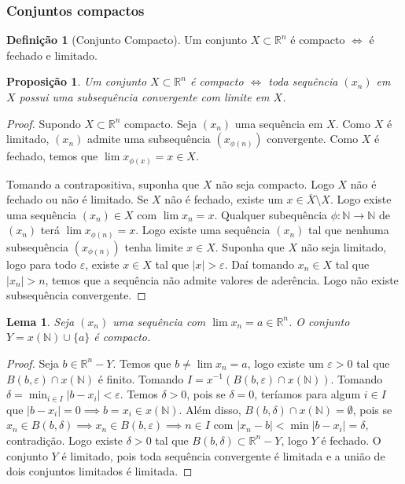 \documentclass{article}
\newtheorem{prop}{Proposição}[section]
\theoremstyle{theorem}
\theoremstyle{lemma}
\newtheorem{lema}{Lema}
\theoremstyle{definition}
\newtheorem{definicao}{Definição}[section]
\theoremstyle{remark}
\begin{document}
   \subsubsection{ Conjuntos compactos}
\begin{definicao}[Conjunto Compacto]
	Um conjunto $X\subset \mathbb{R}^n$ é compacto $\iff $ é fechado e limitado.
\end{definicao}
\begin{prop}
	Um conjunto $X\subset \mathbb{R}^n$ é compacto $\iff$ toda sequência $(x_n)$  em $X$ possui uma subsequência convergente com limite em $X$.
\end{prop}
\begin{proof}
	Supondo $X\subset\mathbb{R}^n$ compacto. Seja $(x_n)$ uma sequência em $X$. Como $X$ é limitado, $(x_n)$ admite uma subsequência $(x_{\phi(n)})$ convergente. Como $X$ é fechado, temos que $\lim x_{\phi(x)}= x\in X$.

	Tomando a contrapositiva, suponha que $X$ não seja compacto. Logo $X$ não é fechado ou não é limitado. Se $X$ não é fechado, existe um $x\in \overline{X} \setminus X$. Logo existe uma sequência $(x_n)\in X$ com $\lim x_n = x$. Qualquer subequência $\phi:\mathbb{N}\to \mathbb{N}$  de $(x_n)$ terá $\lim x_{\phi(n)} = x$. Logo existe uma sequência $(x_n)$ tal que nenhuma subsequência $(x_{\phi(n)})$ tenha limite $x\in X$.
	Suponha que $X$ não seja limitado, logo para todo $\varepsilon$, existe $x\in X$ tal que $|x| > \varepsilon$. Daí tomando $x_n\in X$ tal que $|x_n| > n$, temos que a sequência não admite valores de aderência. Logo não existe subsequência convergente.

\end{proof}
\begin{lema}
	Seja \((x_n) \) uma sequência com \( \lim x_n = a\in \mathbb{R}^n \). O conjunto \( Y = x\left( \mathbb{N} \right) \cup \{ a\} \) é compacto.
\end{lema}
\begin{proof}
	Seja \( b\in \mathbb{R}^n - Y\). Temos que \( b\neq \lim x_n = a \), logo existe um \(\varepsilon>0 \) tal que \(B(b, \varepsilon) \cap x\left(\mathbb{N}\right)\) é finito.  Tomando  \( I = x^{-1}\left(B(b, \varepsilon) \cap x\left(\mathbb{N}\right) \right)\). Tomando \( \delta  = \displaystyle\min_{i\in I} |b- x_i| < \varepsilon \). Temos \(\delta > 0\), pois se \( \delta = 0\), teríamos para algum \(i\in I\) que \( |b-x_i| =0 \implies b = x_i \in x\left(\mathbb{N}\right)\). Além disso, \( B(b, \delta ) \cap x\left(\mathbb{N}\right) = \emptyset \), pois se \( x_n \in B(b,\delta) \implies x_n \in B(b,\varepsilon) \implies n \in I \) com \( |x_n -b| < \min |b-x_i| = \delta\), contradição. Logo existe \(\delta>0\) tal que \( B(b, \delta) \subset \mathbb{R}^n - Y \), logo \( Y \) é fechado.
	O conjunto \( Y\) é limitado, pois toda sequência convergente é limitada e a união de dois conjuntos limitados é limitada.
\end{proof}
\end{document}
